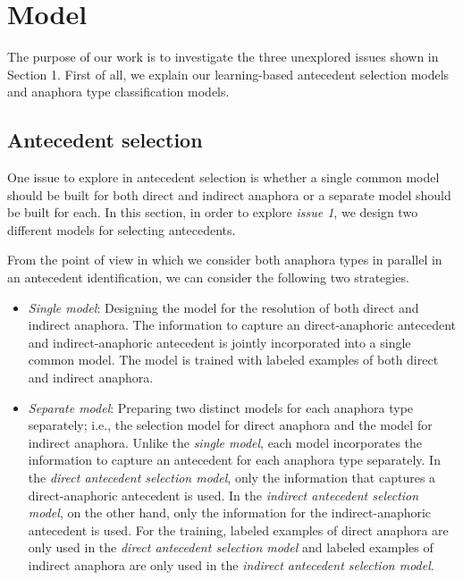 \documentclass[english]{jnlp_1.4}
\begin{document}
\section{Model}

The purpose of our work is to investigate the three unexplored issues
shown in Section 1. First of all, we explain our learning-based
antecedent selection models and anaphora type classification models.


\subsection{Antecedent selection} \label{sec:antecedent_selection}

One issue to explore in antecedent selection is whether a single
common model should be built for both direct and indirect anaphora or
a separate model should be built for each. In this section, in order
to explore \emph{issue 1}, we design two different models for
selecting antecedents.

From the point of view in which we consider both anaphora types in parallel
in an antecedent identification, we can consider the following two
strategies.
\begin{itemize}
\item \emph{Single model}: Designing the model for the resolution of
  both direct and indirect anaphora. The information to capture an
  direct-anaphoric antecedent and indirect-anaphoric antecedent is
  jointly incorporated into a single common model. The model is trained
  with labeled examples of both direct and indirect anaphora.
\item \emph{Separate model}: Preparing two distinct models for each
  anaphora type separately; i.e., the selection model for direct
  anaphora and the model for indirect anaphora. Unlike the
  \emph{single model}, each model incorporates the information to
  capture an antecedent for each anaphora type separately. In the
  \emph{direct antecedent selection model}, only the information that
  captures a direct-anaphoric antecedent is used. In the \emph{indirect
    antecedent selection model}, on the other hand, only the
  information for the indirect-anaphoric antecedent is used. For the
  training, labeled examples of direct anaphora are only used in the
  \emph{direct antecedent selection model} and labeled examples of
  indirect anaphora are only used in the \emph{indirect antecedent
    selection model}.
\end{itemize}
\end{document}
